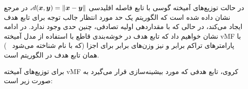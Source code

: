 در حالت توزیع‌های آمیخته گوسی با تابع فاصله اقلیدسی
$d(\bm{x},\bm{y}) = \|{\bm{x}-\bm{y}}\|$،
در مرجع%
~\cite{arthur_kmeans_2007}
نشان داده شده است که الگوریتم
یک حد مورد انتظار جالب توجه برای تابع هدف ایجاد می‌کند، در حالی که با مقداردهی اولیه تصادفی، چنین حدی وجود ندارد.
در ادامه نشان خواهیم داد که تابع هدف در خوشه‌بندی قاطع با استفاده از مدل آمیخته vMF 
با پارامترهای تراکم برابر و نیز وزن‌های برابر برای اجزا
(که با نام
{}
شناخته می‌شود%
~\cite{banerjee_clustering_2005})
همان تابع هدف در الگوریتم
است.

برای توزیع‌های آمیخته vMF کروی، تابع هدفی که مورد بیشینه‌سازی قرار می‌گیرد به صورت زیر است:








